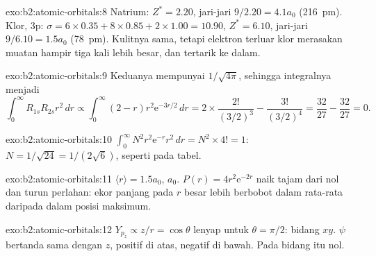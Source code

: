 \begin{solution}{exo:b2:atomic-orbitals:8}
Natrium: $Z^* = 2.20$, jari-jari $9/2.20 = 4.1a_0$ (\qty{216}{pm}). Klor,
3p: $\sigma = 6 \times 0.35 + 8 \times 0.85 + 2 \times 1.00 = 10.90$,
$Z^* = 6.10$, jari-jari $9/6.10 = 1.5a_0$ (\qty{78}{pm}). Kulitnya sama,
tetapi elektron terluar klor merasakan muatan hampir tiga kali lebih besar,
dan tertarik ke dalam.
\end{solution}

\begin{solution}{exo:b2:atomic-orbitals:9}
Keduanya mempunyai  $1/\sqrt{4\pi}$, sehingga integralnya menjadi
\[
  \int_0^\infty R_{1s}R_{2s}r^2\,dr \propto \int_0^\infty (2 - r)r^2\mathrm e^{-3r/2}\,dr =
  2 \times \frac{2!}{(3/2)^3} - \frac{3!}{(3/2)^4} = \frac{32}{27} - \frac{32}{27} = 0 .
\]
\end{solution}

\begin{solution}{exo:b2:atomic-orbitals:10}
$\int_0^\infty N^2r^2\mathrm e^{-r}r^2\,dr = N^2 \times 4! = 1$: $N = 1/\sqrt{24} =
1/(2\sqrt6)$, seperti pada tabel.
\end{solution}

\begin{solution}{exo:b2:atomic-orbitals:11}
$\langle r\rangle = 1.5a_0$,  $a_0$.
$P(r) = 4r^2\mathrm e^{-2r}$ naik tajam dari nol dan turun perlahan: ekor
panjang pada $r$ besar lebih berbobot dalam rata-rata daripada dalam posisi
maksimum.
\end{solution}

\begin{solution}{exo:b2:atomic-orbitals:12}
$Y_{p_z} \propto z/r = \cos\theta$ lenyap untuk $\theta = \pi/2$: bidang $xy$.
$\psi$ bertanda sama dengan $z$, positif di atas, negatif di bawah. Pada
bidang itu  nol.
\end{solution}

